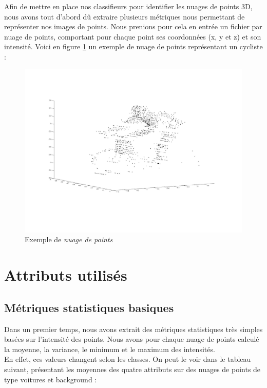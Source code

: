 Afin de mettre en place nos classifieurs pour identifier les nuages de points 3D, nous avons tout d'abord dû extraire plusieurs métriques nous permettant de représenter nos images de points. Nous prenions pour cela en entrée un fichier par nuage de points, comportant pour chaque point ses coordonnées (x, y et z) et son intensité. Voici en figure \ref{fig:nuage_de_points} un exemple de nuage de points représentant un cycliste :

	\begin{figure}[H]
		\centering
		\includegraphics[scale=0.25]{images/objet3D2.jpg}
		\caption{Exemple de \emph{nuage de points}}
		\label{fig:nuage_de_points}
	\end{figure}

\section{Attributs utilisés}
	\subsection{Métriques statistiques basiques}
		Dans un premier temps, nous avons extrait des métriques statistiques très simples basées sur l'intensité des points. Nous avons pour chaque nuage de points calculé la moyenne, la variance, le minimum et le maximum des intensités.\\

		En effet, ces valeurs changent selon les classes. On peut le voir dans le tableau suivant, présentant les moyennes des quatre attributs sur des nuages de points de type voitures et background :\\

